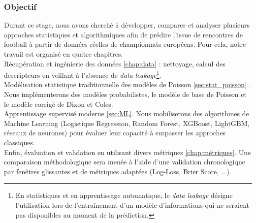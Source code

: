 \subsubsection{Objectif}

Durant ce stage, nous avons cherché à développer, comparer et analyser plusieurs 
approches statistiques et algorithmiques afin de prédire l'issue de rencontres 
de football à partir de données réelles de championnats européens. 
Pour cela, notre travail est organisé en quatre chapitres. 
\\
 Récupération et ingénierie des données \ref{chap:data} : nettoyage, calcul des descripteurs 
en veillant  à l'absence de \textit{data leakage}\footnote{En statistiques et en apprentissage automatique, le 
\textit{data leakage} désigne l'utilisation lors de l'entraînement d'un modèle 
d'informations qui ne seraient pas disponibles au moment de la prédiction.}.
\\
Modélisation statistique traditionnelle 
des modèles de Poisson \ref{sec:stat_poisson} . Nous implémenterons des modèles 
probabilistes, le modèle de base de Poisson et le modèle corrigé de 
Dixon et Coles.
\\
Apprentissage supervisé moderne \ref{sec:ML}. Nous mobiliserons des algorithmes de Machine 
Learning (Logistique Regression, Random Forest, XGBoost, LightGBM, réseaux de neurones) pour évaluer 
leur capacité à surpasser les approches classiques.
\\
Enfin, évaluation et validation en utilisant divers métriques \ref{chap:métriques}. Une comparaison méthodologique 
sera menée à l'aide d'une validation chronologique par fenêtres glissantes et 
de métriques adaptées (Log-Loss, Brier Score, ...).










